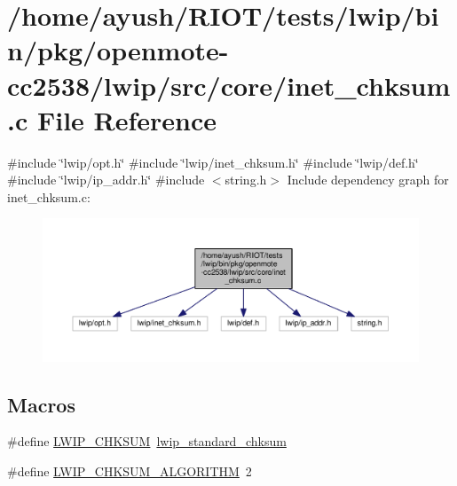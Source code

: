 \hypertarget{openmote-cc2538_2lwip_2src_2core_2inet__chksum_8c}{}\section{/home/ayush/\+R\+I\+O\+T/tests/lwip/bin/pkg/openmote-\/cc2538/lwip/src/core/inet\+\_\+chksum.c File Reference}
\label{openmote-cc2538_2lwip_2src_2core_2inet__chksum_8c}
{\ttfamily \#include \char`\"{}lwip/opt.\+h\char`\"{}}\newline
{\ttfamily \#include \char`\"{}lwip/inet\+\_\+chksum.\+h\char`\"{}}\newline
{\ttfamily \#include \char`\"{}lwip/def.\+h\char`\"{}}\newline
{\ttfamily \#include \char`\"{}lwip/ip\+\_\+addr.\+h\char`\"{}}\newline
{\ttfamily \#include $<$string.\+h$>$}\newline
Include dependency graph for inet\+\_\+chksum.\+c\+:
\nopagebreak
\begin{figure}[H]
\begin{center}
\leavevmode
\includegraphics[width=350pt]{openmote-cc2538_2lwip_2src_2core_2inet__chksum_8c__incl}
\end{center}
\end{figure}
\subsection*{Macros}
\begin{DoxyCompactItemize}
\item 
\#define \hyperlink{openmote-cc2538_2lwip_2src_2core_2inet__chksum_8c_adaaa51e3290b80f8f8f8b1d080f54c1e}{L\+W\+I\+P\+\_\+\+C\+H\+K\+S\+UM}~\hyperlink{openmote-cc2538_2lwip_2src_2core_2inet__chksum_8c_a4c8d40559878aa9bf6bfce8d8ab8a72b}{lwip\+\_\+standard\+\_\+chksum}
\item 
\#define \hyperlink{openmote-cc2538_2lwip_2src_2core_2inet__chksum_8c_aa0865f14286191bd72fc1a9d9cbe25d4}{L\+W\+I\+P\+\_\+\+C\+H\+K\+S\+U\+M\+\_\+\+A\+L\+G\+O\+R\+I\+T\+HM}~2
\end{DoxyCompactItemize}
